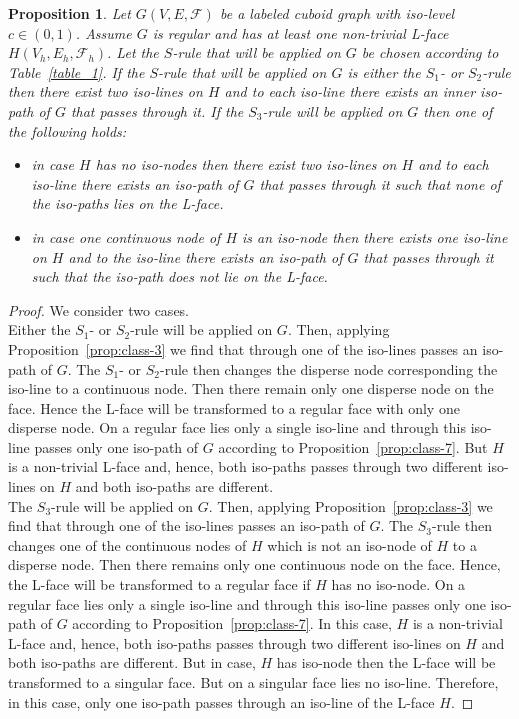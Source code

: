\documentclass[a4paper,11pt]{article}
\newtheorem{proposition}[theorem]{Proposition}
\begin{document}
\vspace{0.2cm}

\begin{proposition}
Let $G(V,E,\mathcal{F})$ be a labeled cuboid graph with iso-level $c\in (0,1)$. Assume $G$ is regular and
has at least one non-trivial L-face $H(V_h,E_h,\mathcal{F}_h)$. Let the $S$-rule that will be applied on $G$
be chosen according to Table~\ref{table_1}. If the $S$-rule that will be applied on $G$ is either the
$S_1$- or $S_2$-rule then there exist two iso-lines on $H$ and to each iso-line there exists an inner
iso-path of $G$ that passes through it. If the $S_3$-rule will be applied on $G$ then one of the following
holds:
\begin{itemize}
\item[(a)] in case $H$ has no iso-nodes then there exist two iso-lines on $H$ and to each iso-line there
exists an iso-path of $G$ that passes through it such that none of the iso-paths lies on the L-face.
\item[(b)] in case one continuous node of $H$ is an iso-node then there exists one iso-line on $H$ and to the
iso-line there exists an iso-path of $G$ that passes through it such that the iso-path does not lie on the
L-face.
\end{itemize}
\label{prop:class-8}
\end{proposition}
\begin{proof} We consider two cases. \\

Either the $S_1$- or $S_2$-rule will be applied on $G$. Then, applying
Proposition~\ref{prop:class-3} we find that through one of the iso-lines passes an iso-path of $G$.
The $S_1$- or $S_2$-rule then changes the disperse node corresponding the iso-line to a continuous node.
Then there remain only one disperse node on the face. Hence the L-face will be transformed to a regular face
with only one disperse node. On a regular face lies only a single iso-line and through this iso-line
passes only one iso-path of $G$ according to Proposition~\ref{prop:class-7}. But $H$ is a non-trivial L-face
and, hence, both iso-paths passes through two different iso-lines on $H$ and both iso-paths are different.\\

The $S_3$-rule will be applied on $G$. Then, applying Proposition~\ref{prop:class-3}
we find that through one of the iso-lines passes an iso-path of $G$. The $S_3$-rule then changes one of the
continuous nodes of $H$ which is not an iso-node of $H$ to a disperse node. Then there remains only one
continuous node on the face. Hence, the L-face will be transformed to a regular face if $H$ has no
iso-node. On a regular face lies only a single iso-line and through this iso-line passes only one iso-path
of $G$ according to Proposition~\ref{prop:class-7}. In this case, $H$ is a non-trivial L-face
and, hence, both iso-paths passes through two different iso-lines on $H$ and both iso-paths are different.
But in case, $H$ has iso-node then the L-face will be transformed to a singular face. But on a singular
face lies no iso-line. Therefore, in this case, only one iso-path passes through an iso-line of the L-face $H$.
\end{proof}
\end{document}
